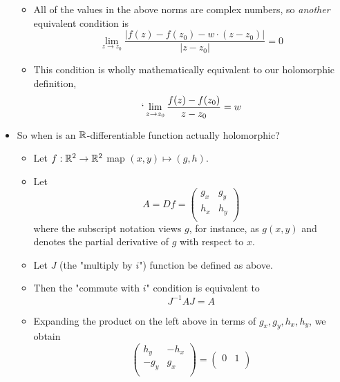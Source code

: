 \documentclass[../notes.tex]{subfiles}
\begin{document}
\begin{itemize}
\begin{itemize}
        \item All of the values in the above norms are complex numbers, so \emph{another} equivalent condition is
        \begin{equation*}
            \lim_{z\to z_0}\frac{|f(z)-f(z_0)-w\cdot(z-z_0)|}{|z-z_0|} = 0
        \end{equation*}
        \item This condition is wholly mathematically equivalent to our holomorphic definition,
        \begin{equation*}
            `\lim_{z\to z_0}\frac{f(z)-f(z_0)}{z-z_0} = w
        \end{equation*}
    \end{itemize}
    \item So when is an $\mathbb{R}$-differentiable function actually holomorphic?
    \begin{itemize}
        \item Let $f:\mathbb{R}^2\to\mathbb{R}^2$ map $(x,y)\mapsto(g,h)$.
        \item Let
        \begin{equation*}
            A = Df =
            \begin{pmatrix}
                g_x & g_y\\
                h_x & h_y\\
            \end{pmatrix}
        \end{equation*}
        where the subscript notation views $g$, for instance, as $g(x,y)$ and denotes the partial derivative of $g$ with respect to $x$.
        \item Let $J$ (the "multiply by $i$") function be defined as above.
        \item Then the "commute with $i$" condition is equivalent to
        \begin{equation*}
            J^{-1}AJ = A
        \end{equation*}
        \item Expanding the product on the left above in terms of $g_x,g_y,h_x,h_y$, we obtain
        \begin{equation*}
            \begin{pmatrix}
                h_y & -h_x\\
                -g_y & g_x\\
            \end{pmatrix}
            =
            \begin{pmatrix}
                0 & 1\\

\end{pmatrix}
\end{equation*}
\end{itemize}
\end{itemize}
\end{document}
